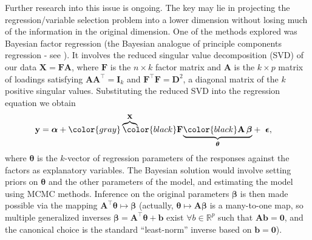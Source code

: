 Further research into this issue is ongoing. The key may lie in projecting the regression/variable selection problem into a lower dimension without losing much of the information in the original dimension. One of the methods explored was Bayesian factor regression (the Bayesian analogue of principle components regression - see \citealp{West2003}). It involves the reduced singular value decomposition (SVD) of our data $\mathbf X=\mathbf F \mathbf A$, where $\mathbf F$ is the $n \times k$ factor matrix and $\mathbf A$ is the $k \times p$ matrix of loadings satisfying $\mathbf A\mathbf A^\top  = \mathbf I_k$ and $\mathbf F^\top \mathbf F = \mathbf D^2$, a diagonal matrix of the $k$ positive singular values\footnotemark. Substituting the reduced SVD into the regression equation we obtain
\begin{align*}
	 \mathbf y &= \boldsymbol{\alpha} 
	 + {\color{gray} \overbrace{\phantom{i}}^{\mathbf X} \hspace{-6.8mm} {\color{black} \mathbf F } \hspace{-0.5mm}
     \underbrace{{\color{black} \mathbf A \, \boldsymbol\beta}}_{\boldsymbol\theta} }
     + \ \boldsymbol{\epsilon},
\end{align*}
where $\boldsymbol{\theta}$ is the $k$-vector of regression parameters of the responses against the factors as explanatory variables. The Bayesian solution would involve setting priors on $\boldsymbol{\theta}$ and the other parameters of the model, and estimating the model using MCMC methods. Inference on the original parameters $\boldsymbol{\beta}$ is then made possible via the mapping $\mathbf A^\top\boldsymbol{\theta} \mapsto \boldsymbol{\beta}$ (actually, $\boldsymbol{\theta} \mapsto \mathbf A\boldsymbol{\beta}$ is a many-to-one map, so multiple generalized inverses $\boldsymbol{\beta} = \mathbf A^\top\boldsymbol{\theta} + \mathbf b$ exist $\forall b \in \mathbb R^p$ such that $\mathbf A\mathbf b = \mathbf 0$, and the canonical choice is the standard ``least-norm'' inverse based on $\mathbf b = \mathbf 0$).

